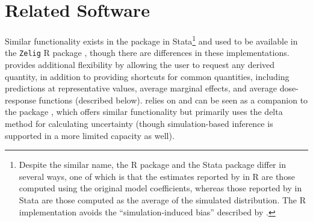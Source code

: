 \section{Related Software}\label{related-software}
Similar functionality exists in the  package in Stata\footnote{Despite the similar name, the R package  and the Stata package  differ in several ways, one of which is that the estimates reported by  in R are those computed using the original model coefficients, whereas those reported by  in Stata are those computed as the average of the simulated distribution. The R implementation avoids the ``simulation-induced bias'' described by \citet{raineyCarefulConsiderationCLARIFY2023}.} \citep{tomzClarifySoftwareInterpreting2003} and used to be available in the \texttt{Zelig} R package \citep{imaiCommonFrameworkStatistical2008a}, though there are differences in these implementations.  provides additional flexibility by allowing the user to request any derived quantity, in addition to providing shortcuts for common quantities, including predictions at representative values, average marginal effects, and average dose-response functions (described below).  relies on and can be seen as a companion to the  package \citep{marginaleffectsforthcoming}, which offers similar functionality but primarily uses the delta method for calculating uncertainty (though simulation-based inference is supported in a more limited capacity as well).
